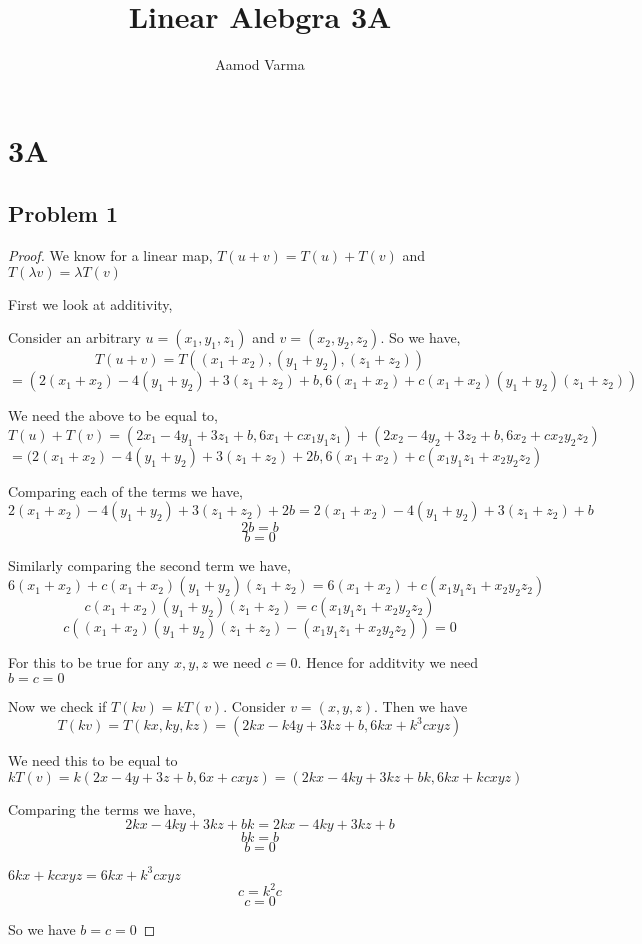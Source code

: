 \documentclass[a4paper]{report}
\title{Linear Alebgra 3A}
\author{Aamod Varma}
\begin{document}
\maketitle
\date{}


\section*{3A}

\subsection*{Problem 1}
\begin{proof}
    
We know for a linear map, $T(u + v) = T(u) + T(v)$ and $T(\lambda v ) = \lambda T(v)$

First we look at additivity, 

Consider an arbitrary  $u = (x_1,y_1,z_1)$ and $v = (x_2,y_2,z_2)$. So we have, 
$$ T(u + v) = T((x_1+x_2),(y_1+y_2),(z_1+z_2))$$ $$ = (2(x_1+x_2) - 4(y_1+y_2) + 3(z_1+z_2) + b, 6(x_1+x_2) + c(x_1+x_2)(y_1+y_2)(z_1+z_2)) $$ 


We need the above to be equal to, 
$$ T(u) + T(v) = (2x_1-4y_1+3z_1 + b, 6x_1 + cx_1y_1z_1) + (2x_2-4y_2+3z_2 + b, 6x_2 + cx_2y_2z_2) $$ 
$$ = (2(x_1+x_2) - 4(y_1+y_2) + 3(z_1+z_2) + 2b, 6(x_1+x_2) + c(x_1y_1z_1+x_2y_2z_2)$$ 

Comparing each of the terms we have, 
$$ 2(x_1+x_2) - 4(y_1+y_2) + 3(z_1+z_2)  + 2b  =  2(x_1+x_2) - 4(y_1+y_2) + 3(z_1+z_2) + b$$ 
$$ 2b = b $$ 
$$ b = 0 $$ 

Similarly comparing the second term we have, 
$$ 6(x_1+x_2) + c(x_1+x_2)(y_1+y_2)(z_1+z_2) =  6(x_1+x_2) + c(x_1y_1z_1+x_2y_2z_2) $$ 
$$ c(x_1+x_2)(y_1+y_2)(z_1+z_2) = c(x_1y_1z_1+x_2y_2z_2) $$ 
$$ c((x_1+x_2)(y_1+y_2)(z_1+z_2) - (x_1y_1z_1+x_2y_2z_2)) = 0 $$ 

For this to be true for any $x,y,z$ we need  $c = 0$. Hence for additvity we need $b = c = 0$

Now we check if $T(k v) = k T(v)$. Consider $v = (x,y,z)$. Then we have 
$$ T(k v) = T(k x,k y,k z) = (2kx - k4y + 3kz + b, 6kx + k^{3}cxyz) $$ 

We need this to be equal to $$kT(v) = k(2x - 4y + 3z + b, 6x + cxyz) = (2kx- 4ky + 3kz + bk, 6kx + kcxyz) $$

Comparing the terms we have, 
$$ 2kx - 4ky + 3kz + bk  = 2kx - 4ky + 3kz + b$$ 
$$ bk = b $$ 
$$b = 0$$

$6kx + kcxyz = 6kx+ k^{3}cxyz$ 
$$ c = k^2 c$$ 
$$ c = 0 $$ 

So we have $b = c = 0$

\end{proof}
\end{document}
